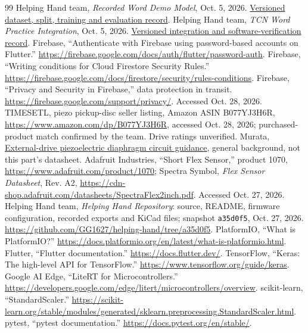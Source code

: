 \documentclass[11pt,letterpaper]{article}
\begin{document}
\begin{thebibliography}{99}
 Helping Hand team, \emph{Recorded Word Demo Model}, Oct. 5, 2026. \href{https://github.com/GG1627/helping-hand/blob/a35d0f5/docs/WORD_MODEL_DEMO_TRAINING.md}{Versioned dataset, split, training and evaluation record}.
 Helping Hand team, \emph{TCN Word Practice Integration}, Oct. 5, 2026. \href{https://github.com/GG1627/helping-hand/blob/a35d0f5/docs/WORD_DEMO_INTEGRATION.md}{Versioned integration and software-verification record}.
 Firebase, ``Authenticate with Firebase using password-based accounts on Flutter.'' \url{https://firebase.google.com/docs/auth/flutter/password-auth}.
 Firebase, ``Writing conditions for Cloud Firestore Security Rules.'' \url{https://firebase.google.com/docs/firestore/security/rules-conditions}.
 Firebase, ``Privacy and Security in Firebase,'' data protection in transit. \url{https://firebase.google.com/support/privacy/}. Accessed Oct. 28, 2026.
 TIMESETL, piezo pickup-disc seller listing, Amazon ASIN B077YJ3H6R, \url{https://www.amazon.com/dp/B077YJ3H6R}, accessed Oct. 28, 2026; purchased-product match confirmed by the team. Drive ratings unverified. Murata, \href{https://www.murata.com/en-global/support/faqs/sound/diaphragm/char/sch0001}{External-drive piezoelectric diaphragm circuit guidance}, general background, not this part's datasheet.
 Adafruit Industries, ``Short Flex Sensor,'' product 1070, \url{https://www.adafruit.com/product/1070}; Spectra Symbol, \emph{Flex Sensor Datasheet}, Rev. A2, \url{https://cdn-shop.adafruit.com/datasheets/SpectraFlex2inch.pdf}. Accessed Oct. 27, 2026.
 Helping Hand team, \emph{Helping Hand Repository}: source, README, firmware configuration, recorded exports and KiCad files; snapshot \texttt{a35d0f5}, Oct. 27, 2026. \url{https://github.com/GG1627/helping-hand/tree/a35d0f5}.
 PlatformIO, ``What is PlatformIO?'' \url{https://docs.platformio.org/en/latest/what-is-platformio.html}.
 Flutter, ``Flutter documentation.'' \url{https://docs.flutter.dev/}.
 TensorFlow, ``Keras: The high-level API for TensorFlow.'' \url{https://www.tensorflow.org/guide/keras}.
 Google AI Edge, ``LiteRT for Microcontrollers.'' \url{https://developers.google.com/edge/litert/microcontrollers/overview}.
 scikit-learn, ``StandardScaler.'' \url{https://scikit-learn.org/stable/modules/generated/sklearn.preprocessing.StandardScaler.html}.
 pytest, ``pytest documentation.'' \url{https://docs.pytest.org/en/stable/}.

\end{thebibliography}
\end{document}
